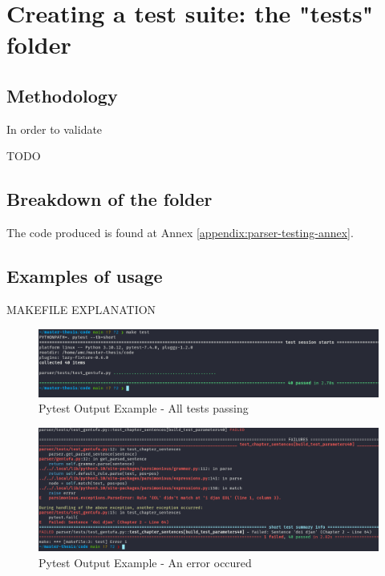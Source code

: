 \chapter{Creating a test suite: the "tests" folder}
\label{chap:creating_a_test_suite}

\section{Methodology}

In order to validate

TODO

\section{Breakdown of the folder}

The code produced is found at Annex \ref{appendix:parser-testing-annex}.

\section{Examples of usage}

MAKEFILE EXPLANATION

\begin{figure}[H]
\hspace{-1.1cm}
\includegraphics[scale=0.43]{images/pytest_output_pass.png}
\caption{Pytest Output Example - All tests passing}
\end{figure}

\begin{figure}[H]
\hspace{-2.2cm}
\includegraphics[scale=0.43]{images/pytest_output_fail.png}
\caption{Pytest Output Example - An error occured}
\end{figure}